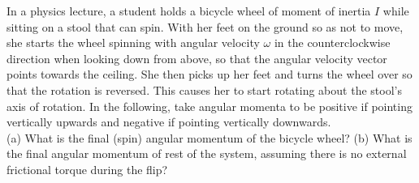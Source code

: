 In a physics lecture, a student holds a bicycle wheel of moment of inertia $I$
while sitting on a stool that can spin. With her feet on the ground
so as not to move, she starts the wheel spinning with angular velocity
$\omega$ in the counterclockwise direction when looking down from above,
so that the angular velocity vector points towards the ceiling. She then picks
up her feet and turns the wheel over so that the rotation is reversed.  This
causes her to start rotating about the stool's axis of rotation. In the following,
take angular momenta to be positive if pointing vertically upwards and negative
if pointing vertically downwards.\\
%
(a) What is the final (spin) angular momentum of the bicycle wheel?\answercheck\hwendpart
%
(b) What is the final angular momentum of rest of the system, assuming
there is no external frictional torque during the flip?\answercheck\hwendpart